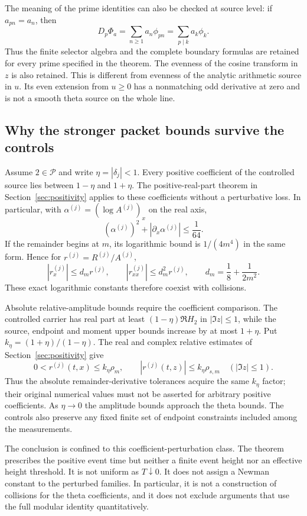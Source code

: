 The meaning of the prime identities can also be checked at source level:
if $a_{pn}=a_n$, then
\[
 D_p\Phi_a=\sum_{n\ge1}a_n\phi_{pn}
          =\sum_{p\mid k}a_k\phi_k .
\]
Thus the finite selector algebra and the complete boundary formulas are
retained for every prime specified in the theorem.
The evenness of the cosine transform in $z$ is also retained. This is
different from evenness of the analytic arithmetic source in $u$.
Its even extension from $u\ge0$ has a nonmatching odd derivative at zero
and is not a smooth theta source on the whole line.

\subsection{Why the stronger packet bounds survive the controls}

Assume $2\in\mathcal P$ and write $\eta=|\delta_j|<1$.
Every positive coefficient of the controlled source lies between
$1-\eta$ and $1+\eta$. The positive-real-part theorem in
Section~\ref{sec:positivity} applies to these coefficients without a
perturbative loss. In particular, with
$\alpha^{(j)}=(\log A^{(j)})_x$ on the real axis,
\begin{equation}\label{eq:control-sharp-curvature}
 (\alpha^{(j)})^2+|\partial_x\alpha^{(j)}|\le\frac1{64}.
\end{equation}
If the remainder begins at $m$, its logarithmic bound is
$1/(4m^4)$ in the same form. Hence for $r^{(j)}=R^{(j)}/A^{(j)}$,
\[
 |r_x^{(j)}|\le d_m r^{(j)},\qquad
 |r_{xx}^{(j)}|\le d_m^2r^{(j)},\qquad
 d_m=\frac18+\frac1{2m^2}.
\]
These exact logarithmic constants therefore coexist with collisions.

Absolute relative-amplitude bounds require the coefficient comparison.
The controlled carrier has real part at least $(1-\eta)\Re H_2$ in
$|\Im z|\le1$, while the source, endpoint and moment upper bounds increase
by at most $1+\eta$. Put $k_\eta=(1+\eta)/(1-\eta)$. The real and
complex relative estimates of Section~\ref{sec:positivity} give
\[
 0<r^{(j)}(t,x)\le k_\eta\rho_m,\qquad
 |r^{(j)}(t,z)|\le k_\eta\rho_{s,m}\quad(|\Im z|\le1).
\]
Thus the absolute remainder-derivative tolerances acquire the same
$k_\eta$ factor; their original numerical values must not be asserted
for arbitrary positive coefficients. As $\eta\to0$ the amplitude
bounds approach the theta bounds. The controls also preserve any fixed
finite set of endpoint constraints included among the measurements.

The conclusion is confined to this coefficient-perturbation class.
The theorem prescribes the positive event time but neither a finite
event height nor an effective height threshold. It is not uniform as
$T\downarrow0$. It does not assign a Newman constant to the perturbed
families. In particular, it is not a construction of collisions for the
theta coefficients, and it does not exclude arguments that use the full
modular identity quantitatively.
